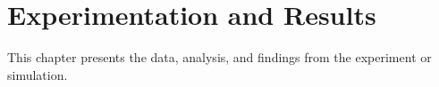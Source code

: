 \chapter{Experimentation and Results}
This chapter presents the data, analysis, and findings from the experiment or simulation.